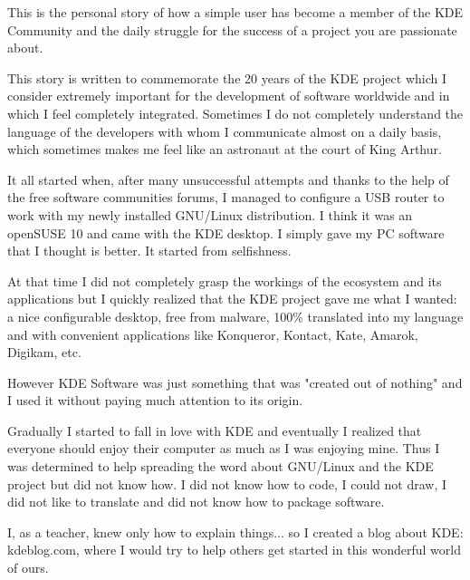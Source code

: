 

\noindent{}This is the personal story of how a simple user has become a member of the KDE Community and the daily struggle for the success of a project you are passionate about.

This story is written to commemorate the 20 years of the KDE project which I consider extremely important for the development of software worldwide and in which I feel completely integrated. Sometimes I do not completely understand the language of the developers with whom I communicate almost on a daily basis, which sometimes makes me feel like an astronaut at the court of King Arthur.

It all started when, after many unsuccessful attempts and thanks to the help of the free software communities forums, I managed to configure a USB router to work with my newly installed GNU/Linux distribution. I think it was an openSUSE 10 and came with the KDE desktop. I simply gave my PC software that I thought is better. It started from selfishness.

At that time I did not completely grasp the workings of the ecosystem and its applications but I quickly realized that the KDE project gave me what I wanted: a nice configurable desktop, free from malware, 100\% translated into my language and with convenient applications like Konqueror, Kontact, Kate, Amarok, Digikam, etc.

However KDE Software was just something that was "created out of nothing" and I used it without paying much attention to its origin.

Gradually I started to fall in love with KDE and eventually I realized that everyone should enjoy their computer as much as I was enjoying mine.
Thus I was determined to help spreading the word about GNU/Linux and the KDE project but did not know how. I did not know how to code, I could not draw, I did not like to translate and did not know how to package software.

I, as a teacher, knew only how to explain things... so I created a blog about KDE: kdeblog.com, where I would try to help others get started in this wonderful world of ours.

